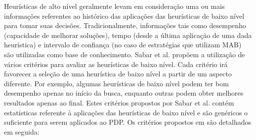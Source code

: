 Heurísticas de alto nível geralmente levam em consideração uma ou mais informações referentes ao histórico das aplicações das heurísticas de baixo nível para tomar suas decisões. Tradicionalmente, informações tais como desempenho (capacidade de melhorar soluções), tempo (desde a última aplicação de uma dada heurística) e intervalo de confiança (no caso de estratégias que utilizam MAB) são utilizadas como base de conhecimento.  Sabar et al. \cite{sabar2015automatic} propõem a utilização de vários critérios para avaliar as heurísticas de baixo nível. Cada critério irá favorecer a seleção de uma heurística de baixo nível a partir de um aspecto diferente. Por exemplo, algumas heurísticas de baixo nível podem ter bom desempenho apenas no início da busca, enquanto outras podem obter melhores resultados apenas ao final. Estes critérios propostos por Sabar et al. contém estatísticas referente à aplicações das heurísticas de baixo nível e são genéricos o suficiente para serem aplicados ao PDP. Os critérios propostos em \cite{sabar2015automatic} são detalhados em seguida:


